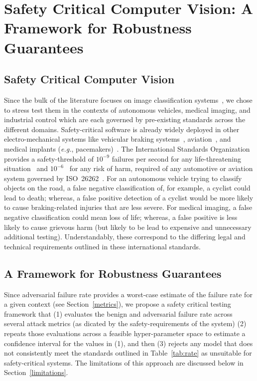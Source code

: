 \documentclass[journal]{IEEEtran}
\begin{document}
\section{Safety Critical Computer Vision: A Framework for Robustness Guarantees}
\label{safety-critical}

\subsection{Safety Critical Computer Vision}
Since the bulk of the literature focuses on image classification systems~\cite{dohmatob_generalized_2019,biggio_evasion_2013-1,bect_bayesian_2017,chakraborty_adversarial_2018,carlini_towards_2017,croce_reliable_2020}, we chose to stress test them in the contexts of autonomous vehicles, medical imaging, and industrial control which are each governed by pre-existing standards across the different domains.
Safety-critical software is already widely deployed in other electro-mechanical systems like vehicular braking systems~\cite{braking}, aviation~\cite{aviation}, and medical implants (\textit{e.g.}, pacemakers)~\cite{tuan2010modeling}.
The International Standards Organization provides a safety-threshold of $10^{-9}$ failures per second for any life-threatening situation~\cite{iso26262} and $10^{-6}$~\cite{iso26262} for any risk of harm, required of any automotive or aviation system governed by ISO~26262~\cite{iso26262}.
For an autonomous vehicle trying to classify objects on the road, a false negative classification of, for example, a cyclist could lead to death; whereas, a false positive detection of a cyclist would be more likely to cause braking-related injuries that are less severe.
For medical imaging, a false negative classification could mean loss of life; whereas, a false positive is less likely to cause grievous harm (but likely to be lead to expensive and unnecessary additional testing).
Understandably, these correspond to the differing legal and technical requirements outlined in these international standards.



\subsection{A Framework for Robustness Guarantees}
\label{safety_critical}
Since adversarial failure rate provides a worst-case estimate of the failure rate for a given context (see Section~\ref{metrics}), we propose a safety critical testing framework that (1) evaluates the benign and adversarial failure rate across several attack metrics (as dicated by the safety-requirements of the system) (2) repeats those evaluations across a feasible hyper-parameter space to estimate a confidence interval for the values in (1), and then (3)  rejects any model that does not consistently meet the standards outlined in Table~\ref{tab:rate} as unsuitable for safety-critical systems.
The limitations of this approach are discussed below in Section~\ref{limitations}.
\end{document}
